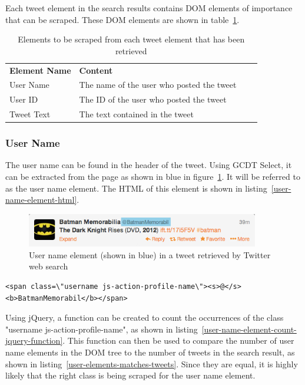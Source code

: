 Each tweet element in the search results contains DOM elements of importance that can be scraped.
These DOM elements are shown in table~\ref{table:important-tweet-element-elements}.

\begin{table}[H]
\centering
\begin{tabularx}{5.3\textwidth}{ lp{7cm} lp{5cm} }
  \textbf{Element Name} & \textbf{Content}\\
  \cline{0-1}
  User Name & The name of the user who posted the tweet \\
  \cline{0-1}
  User ID & The ID of the user who posted the tweet \\
  \cline{0-1}
  Tweet Text & The text contained in the tweet
\end{tabularx}
\caption[Elements to be scraped from tweets]{Elements to be scraped from each tweet element that has been retrieved}
\label{table:important-tweet-element-elements}
\end{table}

\subsubsection{User Name}
The user name can be found in the header of the tweet. Using GCDT Select, it can be extracted from the page as shown in blue in figure~\ref{figure:tweet-user-field}. It will be referred to as the user name element. The HTML of this element is shown in listing~\ref{user-name-element-html}.

\begin{figure}[H]
\includegraphics[width=4in]{image/tweet-user-field.png}
\centering
\caption[User name element in tweet]{User name element (shown in blue) in a tweet retrieved by Twitter web search}
\label{figure:tweet-user-field}
\end{figure}

\begin{lstlisting}[caption={HTML of the user name element in a tweet},label={user-name-element-html},captionpos=b]
  <span class=\"username js-action-profile-name\"><s>@</s><b>BatmanMemorabil</b></span>
\end{lstlisting}

\noindent
Using jQuery, a function can be created to count the occurrences of the class "username js-action-profile-name", as shown in listing~\ref{user-name-element-count-jquery-function}. This function can then be used to compare the number of user name elements in the DOM tree to the number of tweets in the search result, as shown in listing~\ref{user-elements-matches-tweets}. Since they are equal, it is highly likely that the right class is being scraped for the user name element.

